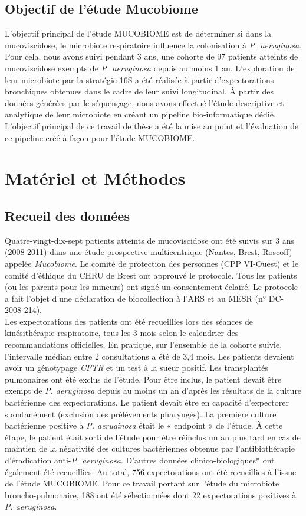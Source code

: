 \documentclass[12pt,a4paper]{article}
\begin{document}
\subsection{Objectif de l'étude Mucobiome}
L'objectif principal de l'étude MUCOBIOME est de déterminer si dans la mucoviscidose, le microbiote respiratoire influence la colonisation à \textit{P. aeruginosa}.
Pour cela, nous avons suivi pendant 3 ans,  une cohorte de 97 patients atteints de mucoviscidose exempts de \textit{P. aeruginosa} depuis au moins 1 an.
L'exploration de leur microbiote par la stratégie 16S a été réalisée à partir d'expectorations bronchiques obtenues dans le cadre de leur suivi longitudinal.
À partir des données générées par le séquençage, nous avons effectué l'étude descriptive et analytique de leur microbiote en créant un pipeline bio-informatique dédié. L'objectif principal de ce travail de thèse a été la mise au point et l'évaluation de ce pipeline créé à façon pour l'étude MUCOBIOME.

\section{Matériel et Méthodes}
\subsection{Recueil des données}

Quatre-vingt-dix-sept patients atteints de mucoviscidose ont été suivis sur 3 ans (2008-2011) dans une étude prospective multicentrique (Nantes, Brest, Roscoff) appelée \textit{Mucobiome}.
Le comité de protection des personnes (CPP VI-Ouest) et le comité d’éthique du CHRU de Brest ont approuvé le protocole. Tous les patients (ou les parents pour les mineurs) ont signé un consentement éclairé. Le protocole a fait l’objet d’une déclaration de biocollection à l’ARS et au MESR (n° DC-2008-214).\\
Les expectorations des patients ont été recueillies lors des séances de kinésithérapie respiratoire, tous les 3 mois selon le calendrier des recommandations officielles. En pratique, sur l’ensemble de la cohorte suivie, l’intervalle médian entre 2 consultations a été de 3,4 mois.
Les patients devaient avoir un génotypage \textit{CFTR} et un test à la sueur positif. Les transplantés pulmonaires ont été exclus de l’étude.
Pour être inclus, le patient devait être exempt de \textit{P. aeruginosa} depuis au moins un an d’après les résultats de la culture bactérienne des expectorations. Le patient devait être en capacité d’expectorer spontanément (exclusion des prélèvements pharyngés).
La première culture bactérienne positive à \textit{P. aeruginosa} était le « endpoint » de l’étude. À cette étape, le patient était sorti de l’étude pour être réinclus un an plus tard en cas de maintien de la négativité des cultures bactériennes obtenue par l’antibiothérapie d’éradication anti-\textit{P. aeruginosa}. D’autres données clinico-biologiques* ont également été recueillies. Au total, 756 expectorations ont été recueillies à l’issue de l’étude MUCOBIOME. Pour ce travail portant sur l’étude du microbiote broncho-pulmonaire, 188 ont été sélectionnées dont 22 expectorations positives à \textit{P. aeruginosa}.
\end{document}
